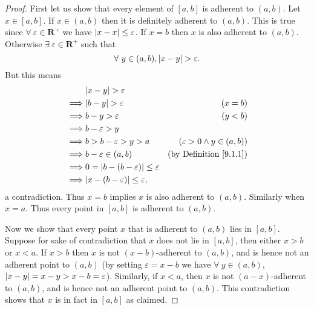\begin{proof}
    First let us show that every element of \([a, b]\) is adherent to \((a, b)\).
    Let \(x \in [a, b]\).
    If \(x \in (a, b)\) then it is definitely adherent to \((a, b)\).
    This is true since \(\forall\ \varepsilon \in \mathbf{R}^+\) we have \(\abs*{x - x} \leq \varepsilon\).
    If \(x = b\) then \(x\) is also adherent to \((a, b)\).
    Otherwise \(\exists\ \varepsilon \in \mathbf{R}^+\) such that
    \[
        \forall\ y \in (a, b), \abs*{x - y} > \varepsilon.
    \]
    But this means
    \begin{align*}
                 & \abs*{x - y} > \varepsilon                                                               \\
        \implies & \abs*{b - y} > \varepsilon                        & (x = b)                              \\
        \implies & b - y > \varepsilon                               & (y < b)                              \\
        \implies & b - \varepsilon > y                                                                      \\
        \implies & b > b - \varepsilon > y > a                       & (\varepsilon > 0 \land y \in (a, b)) \\
        \implies & b - \varepsilon \in (a, b)                        & \text{(by Definition \ref{9.1.1})}   \\
        \implies & 0 = \abs*{b - (b - \varepsilon)} \leq \varepsilon                                        \\
        \implies & \abs*{x - (b - \varepsilon)} \leq \varepsilon,
    \end{align*}
    a contradiction.
    Thus \(x = b\) implies \(x\) is also adherent to \((a, b)\).
    Similarly when \(x = a\).
    Thus every point in \([a, b]\) is adherent to \((a, b)\).

    Now we show that every point \(x\) that is adherent to \((a, b)\) lies in \([a, b]\).
    Suppose for sake of contradiction that \(x\) does not lie in \([a, b]\), then either \(x > b\) or \(x < a\).
    If \(x > b\) then \(x\) is not \((x - b)\)-adherent to \((a, b)\), and is hence not an adherent point to \((a, b)\)
    (by setting \(\varepsilon = x - b\) we have \(\forall\ y \in (a, b)\), \(\abs*{x - y} = x - y > x - b = \varepsilon\)).
    Similarly, if \(x < a\), then \(x\) is not \((a - x)\)-adherent to \((a, b)\), and is hence not an adherent point to \((a, b)\).
    This contradiction shows that \(x\) is in fact in \([a, b]\) as claimed.


\end{proof}
